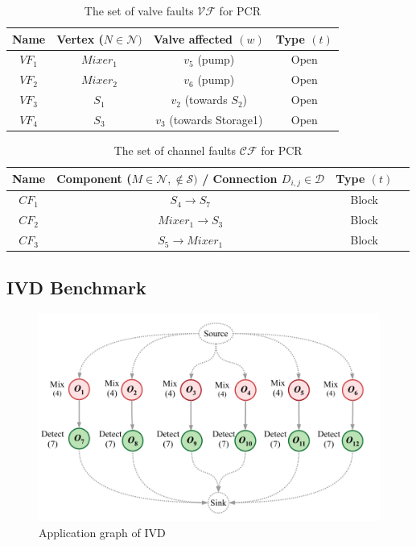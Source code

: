 \begin{table}[H]
\centering
\caption{The set of valve faults $\mathcal{VF}$ for PCR}
\begin{tabular}{| c | c | c | c |}
\hline
\textbf{Name} & \textbf{Vertex} ($N \in \mathcal{N})$ & \textbf{Valve affected} $(w)$ & \textbf{Type} $(t)$ \\ \hline
$VF_1$ & $Mixer_1$ & $v_5$ (pump) & Open \\ \hline
$VF_2$ & $Mixer_2$ & $v_6$ (pump) & Open \\ \hline
$VF_3$ & $S_1$ & $v_2$ (towards $S_2$) & Open \\ \hline
$VF_4$ & $S_3$ & $v_3$ (towards Storage1) & Open \\ \hline
\end{tabular}
\label{tab:pcr-vf}
\end{table}

\begin{table}[H]
\centering
\caption{The set of channel faults $\mathcal{CF}$ for PCR}
\begin{tabular}{| c | c | c | c |}
\hline
\textbf{Name} & \textbf{Component} ($M \in \mathcal{N}, \notin \mathcal{S})$ \textbf{/ Connection} $D_{i, j} \in \mathcal{D}$ & \textbf{Type} $(t)$ \\ \hline
$CF_1$ & $S_4 \rightarrow S_7$ & Block \\ \hline
$CF_2$ & $Mixer_1 \rightarrow S_3$ & Block \\ \hline
$CF_3$ & $S_5 \rightarrow Mixer_1$ & Block \\ \hline
\end{tabular}
\label{tab:pcr-cf}
\end{table}

\subsection{IVD Benchmark}
\begin{figure}[H]
\centering
\includegraphics[scale=0.4]{figures/ivd-application.png}
\caption[Application graph of IVD \cite{wajid}]{Application graph of IVD \cite{wajid}}
\label{fig:ivd-app}
\end{figure}

